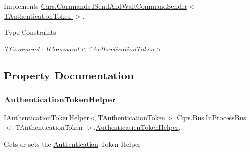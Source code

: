 Implements \hyperlink{interfaceCqrs_1_1Commands_1_1ISendAndWaitCommandSender_a8a9b1333e70cc9d8a91d6374354a851f}{Cqrs.\+Commands.\+I\+Send\+And\+Wait\+Command\+Sender$<$ T\+Authentication\+Token $>$}.

\begin{Desc}
\item[Type Constraints]\begin{description}
\item[{\em T\+Command} : {\em I\+Command$<$T\+Authentication\+Token$>$}]\end{description}
\end{Desc}


\subsection{Property Documentation}
\mbox{\label{classCqrs_1_1Bus_1_1InProcessBus_a20d068b944183ab04e77c3164d19a860}} 
\subsubsection{\texorpdfstring{Authentication\+Token\+Helper}{AuthenticationTokenHelper}}
{\footnotesize\ttfamily \hyperlink{interfaceCqrs_1_1Authentication_1_1IAuthenticationTokenHelper}{I\+Authentication\+Token\+Helper}$<$T\+Authentication\+Token$>$ \hyperlink{classCqrs_1_1Bus_1_1InProcessBus}{Cqrs.\+Bus.\+In\+Process\+Bus}$<$ T\+Authentication\+Token $>$.\hyperlink{classCqrs_1_1Authentication_1_1AuthenticationTokenHelper}{Authentication\+Token\+Helper}\hspace{0.3cm}{\ttfamily [get]}, {\ttfamily [protected]}}



Gets or sets the \hyperlink{namespaceCqrs_1_1Authentication}{Authentication} Token Helper 

\mbox{\label{classCqrs_1_1Bus_1_1InProcessBus_a5dd1cb40277f3e04e743dd8cd63523ff}} 

